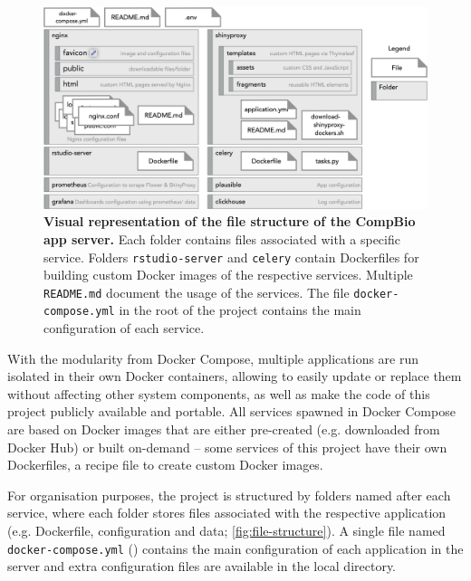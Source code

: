 \begin{figure}[!b]
  \includegraphics[width=1\textwidth]{images/app-server/file-structure}
  \centering
  \caption[App server's file structure]{\textbf{Visual representation of the file structure of the CompBio app server.} Each folder contains files associated with a specific service. Folders \texttt{rstudio-server} and \texttt{celery} contain Dockerfiles for building custom Docker images of the respective services. Multiple \texttt{README.md} document the usage of the services. The file \texttt{docker-compose.yml} in the root of the project contains the main configuration of each service.}
  \label{fig:file-structure}
\end{figure}

With the modularity from Docker Compose, multiple applications are run isolated in their own Docker containers, allowing to easily update or replace them without affecting other system components, as well as make the code of this project publicly available and portable. All services spawned in Docker Compose are based on Docker images that are either pre-created (e.g. downloaded from Docker Hub) or built on-demand -- some services of this project have their own Dockerfiles, a recipe file to create custom Docker images.

For organisation purposes, the project is structured by folders named after each service, where each folder stores files associated with the respective application (e.g. Dockerfile, configuration and data; \autoref{fig:file-structure}). A single file named \texttt{docker-compose.yml} () contains the main configuration of each application in the server and extra configuration files are available in the local directory.

